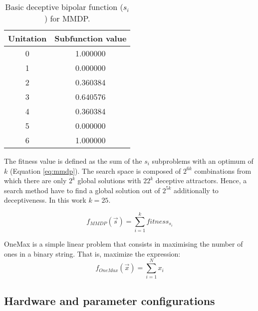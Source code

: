 \documentclass[final,1p,times]{elsarticle}
\begin{document}
\begin{table}

\centering
{\scriptsize
\caption{ Basic deceptive bipolar function ($s_i$) for MMDP.}
\label{table:mmdpvalues}
\begin{tabular}{|c|c|}
\hline
Unitation&Subfunction value\\
\hline
0 & 1.000000 \\
\hline
1 & 0.000000 \\
\hline
2 & 0.360384 \\
\hline
3 & 0.640576\\
\hline
4 & 0.360384\\
\hline
5 & 0.000000\\
\hline
6 & 1.000000\\
\hline

\end{tabular}
}


\end{table}



The fitness value is defined as the sum of the $s_i$ subproblems with an optimum of $k$ (Equation \ref{eq:mmdp}).
The search space is composed of $2^{6k}$ combinations from which there
are only $2^k$ global solutions with $22^k$ deceptive
attractors. Hence, a search method have to find a global solution
out of $2^{5k}$ additionally to deceptiveness. In this work $k=25$. 

\begin{equation}\label{eq:mmdp}
f_{MMDP}(\vec s)= \sum_{i=1}^{k} fitness_{s_i}
\end{equation}

OneMax is a simple linear problem that consists in maximising the number of ones in a binary string. That is, maximize the expression:
\begin{equation}
f_{OneMax}(\vec{x}) = \sum_{i=1}^{N}{x_{i}}
\end{equation}

\subsection{Hardware and parameter configurations}


\end{document}
